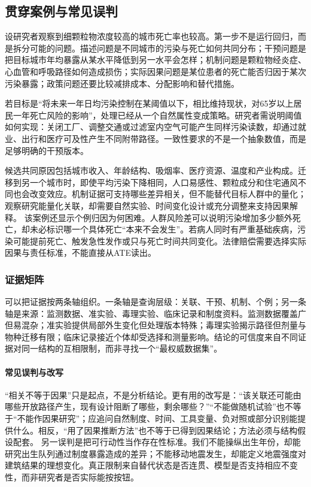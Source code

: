 \subsection{贯穿案例与常见误判}

设研究者观察到细颗粒物浓度较高的城市死亡率也较高。第一步不是运行回归，而是拆分可能的问题。描述问题是不同城市的污染与死亡如何共同分布；干预问题是把目标城市年均暴露从某水平降低到另一水平会怎样；机制问题是颗粒物经炎症、心血管和呼吸路径如何造成损伤；实际因果问题是某位患者的死亡能否归因于某次污染暴露；政策问题还要比较减排成本、分配影响和替代措施。

若目标是“将未来一年日均污染控制在某阈值以下，相比维持现状，对65岁以上居民一年死亡风险的影响”，处理已经从一个自然属性变成策略。研究者需说明阈值如何实现：关闭工厂、调整交通或过滤室内空气可能产生同样污染读数，却通过就业、出行和医疗可及性产生不同附带路径。一致性要求的不是一个抽象数值，而是足够明确的干预版本。

候选共同原因包括城市收入、年龄结构、吸烟率、医疗资源、温度和产业构成。迁移到另一个城市时，即使平均污染下降相同，人口易感性、颗粒成分和住宅通风不同也会改变效应。机制证据可支持哪些差异相关，但不能替代目标人群中的量化；观察研究能量化关联，却需要自然实验、时间变化设计或充分调整来支持因果解释。
该案例还显示个例归因为何困难。人群风险差可以说明污染增加多少额外死亡，却未必标识哪一个具体死亡“本来不会发生”。若病人同时有严重基础疾病，污染可能提前死亡、触发急性发作或只与死亡时间共同变化。法律赔偿需要选择实际因果与责任标准，不能直接从ATE读出。

\subsubsection{证据矩阵}

可以把证据按两条轴组织。一条轴是查询层级：关联、干预、机制、个例；另一条轴是来源：监测数据、准实验、毒理实验、临床记录和制度资料。监测数据覆盖广但易混杂；准实验提供局部外生变化但处理版本特殊；毒理实验揭示路径但剂量与物种迁移有限；临床记录接近个体却受选择和测量影响。结论的可信度来自不同证据对同一结构的互相限制，而非寻找一个“最权威数据集”。

\paragraph{常见误判与改写}

“相关不等于因果”只是起点，不是分析结论。更有用的改写是：“该关联还可能由哪些开放路径产生，现有设计阻断了哪些，剩余哪些？”“不能做随机试验”也不等于“不能作因果研究”；应追问自然制度、时间、工具变量、负对照或部分识别能提供什么。相反，“用了因果推断方法”也不等于已得到因果结论；方法必须与结构假设配套。
另一误判是把可行动性当作存在性标准。我们不能操纵出生年份，却能研究出生队列通过制度暴露造成的差异；不能移动地震发生，却能定义地震强度对建筑结果的理想变化。真正限制来自替代状态是否连贯、模型是否支持相应不变性，而非研究者是否实际能按按钮。

